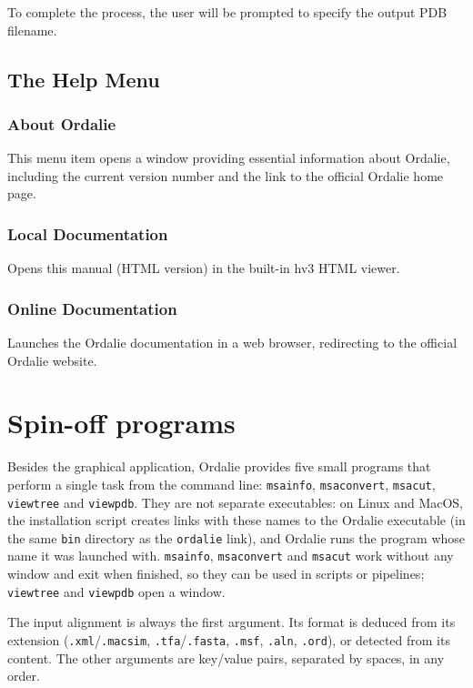 \documentclass[a4paper]{article}
\begin{document}
To complete the process, the user will be prompted to specify the output PDB filename.


\subsection{The Help Menu}

\subsubsection{About Ordalie}
This menu item opens a window providing essential information about Ordalie, including the current version number and the link to the official Ordalie home page.

\subsubsection{Local Documentation}
Opens this manual (HTML version) in the built-in hv3 HTML viewer.

\subsubsection{Online Documentation}
Launches the Ordalie documentation in a web browser, redirecting to the official Ordalie website.


\newpage
\section{Spin-off programs}
\label{chap-spinoff}
Besides the graphical application, Ordalie provides five small programs that perform a single task from the command line: \texttt{msainfo}, \texttt{msaconvert}, \texttt{msacut}, \texttt{viewtree} and \texttt{viewpdb}. They are not separate executables: on Linux and MacOS, the installation script creates links with these names to the Ordalie executable (in the same \texttt{bin} directory as the \texttt{ordalie} link), and Ordalie runs the program whose name it was launched with. \texttt{msainfo}, \texttt{msaconvert} and \texttt{msacut} work without any window and exit when finished, so they can be used in scripts or pipelines; \texttt{viewtree} and \texttt{viewpdb} open a window.

The input alignment is always the first argument. Its format is deduced from its extension (\texttt{.xml}/\texttt{.macsim}, \texttt{.tfa}/\texttt{.fasta}, \texttt{.msf}, \texttt{.aln}, \texttt{.ord}), or detected from its content. The other arguments are key/value pairs, separated by spaces, in any order.
\end{document}
